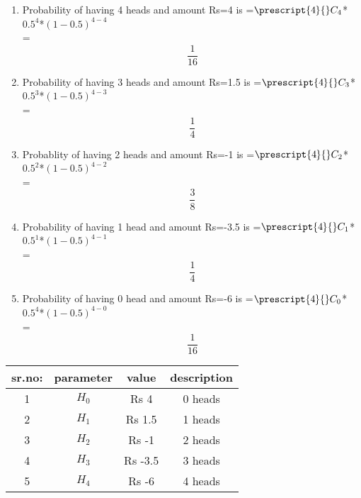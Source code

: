 \documentclass[journal,12pt,twocolumn]{IEEEtran}
\newcommand\Mycomb[2][^n]{\prescript{#1\mkern-0.5mu}{}C_{#2}}
\begin{document}
        \begin{enumerate}
	        \item Probability of having 4 heads and amount Rs=4 is 
			 =${\Mycomb[4]{4}}$*${0.5^4}$*${{(1-0.5)}^{4-4}}$\\
		        =\[\frac{1}{16}\] 
		\item Probability of having 3 heads and amount Rs=1.5 is
		        =${\Mycomb[4]{3}}$*${0.5^3}$*${{(1-0.5)}^{4-3}}$\\
		        =\[\frac{1}{4}\] 
		\item Probablity  of  having 2 heads and amount Rs=-1 is 
		        =${\Mycomb[4]{2}}$*${0.5^2}$*${{(1-0.5)}^{4-2}}$\\
		        =\[\frac{3}{8}\] 
		\item Probability  of  having 1 head and amount Rs=-3.5 is
		        =${\Mycomb[4]{1}}$*${0.5^1}$*${{(1-0.5)}^{4-1}}$\\
		        =\[\frac{1}{4}\] 
		\item Probability  of  having 0 head and amount Rs=-6 is 
		        =${\Mycomb[4]{0}}$*${0.5^4}$*${{(1-0.5)}^{4-0}}$\\
		        =\[\frac{1}{16}\] 
	\end{enumerate}
       \begin{center}
\begin{tabular}{||c c c c||} 
 \hline
 sr.no: & parameter & value & description \\ [0.5ex] 
 \hline\hline
 1 & $H_{0}$ & Rs 4 & 0 heads \\ 
 \hline
 2 & $H_{1}$ & Rs 1.5 & 1 heads \\
 \hline
 3 & $H_{2}$ & Rs -1 & 2 heads \\
 \hline
 4 & $H_{3}$ & Rs -3.5 & 3 heads \\
 \hline
 5 & $H_{4}$ & Rs -6 & 4 heads \\ [1ex] 
 \hline
\end{tabular}
\end{center}
         
	
\end{document}
